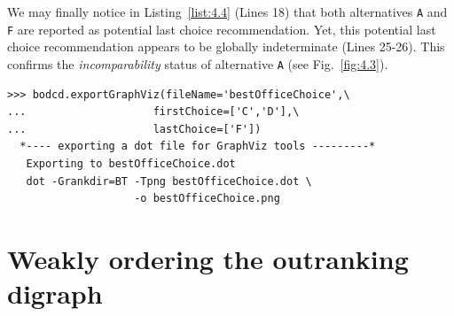We may finally notice in Listing~\vref{list:4.4} (Lines 18) that both alternatives \texttt{A} and \texttt{F} are reported as potential last choice recommendation. Yet, this potential last choice recommendation appears to be globally indeterminate (Lines 25-26). This confirms the \emph{incomparability} status of alternative \texttt{A} (see Fig.~\vref{fig:4.3}).
\begin{lstlisting}
>>> bodcd.exportGraphViz(fileName='bestOfficeChoice',\
...                    firstChoice=['C','D'],\
...                    lastChoice=['F'])
  *---- exporting a dot file for GraphViz tools ---------*
   Exporting to bestOfficeChoice.dot
   dot -Grankdir=BT -Tpng bestOfficeChoice.dot \
                    -o bestOfficeChoice.png
\end{lstlisting}

\section{Weakly ordering the outranking digraph}
\label{sec:4.6}

